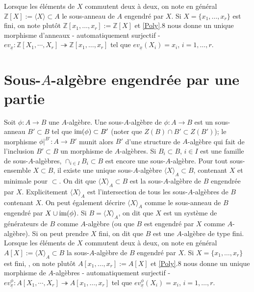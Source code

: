 \documentclass[a4paper, oneside, 12pt]{book}
\theoremstyle{theoremeStyle} %
\theoremstyle{definition} %
\newcommand{\Z}{\mathbb{Z}}
\begin{document}
 Lorsque les éléments de $X$ commutent deux à deux, on note en général $\Z[X]:=\langle X\rangle \subset A$ le sous-anneau de $A$ engendré par $X$. Si  $X=\lbrace x_1,\dots,x_r\rbrace $ est fini, on note plutôt $\Z[x_1,\dots,x_r]:=\Z[X]$ et \ref{Poly}.8  nous donne un unique morphisme d'anneaux - automatiquement  surjectif - $ev_{\underline{x}}:\Z[X_1,\cdots, X_r]\twoheadrightarrow \Z[x_1,\dots,x_r] $ tel que $ev_{\underline{x}}(X_i)=x_i$, $i=1,\dots, r$.   \\

  \section{Sous-$A$-algèbre engendrée par une partie}\label{SousAlg} Soit $\phi:A\rightarrow B$ une $A$-algèbre. Une sous-$A$-algèbre de $\phi:A\rightarrow B$ est un sous-anneau $B'\subset B$ tel que $\hbox{\rm im}(\phi)\subset B'$ (noter que $Z(B)\cap B'\subset Z(B')$); le morphisme $\phi|^{B'}:A\rightarrow B'$ munit alors $B'$ d'une structure de $A$-algèbre qui fait de l'inclusion $B'\subset B$ un morphisme de $A$-algèbres. Si    $B_i\subset B$, $i\in I$ est une famille de sous-$A$-algèbres, $\cap_{i\in I}B_i\subset B$  est encore une sous-$A$-algèbre. Pour tout sous-ensemble $X\subset B$, il existe
une unique sous-$A$-algèbre $\langle X\rangle_A \subset B$, contenant $X$ et minimale pour $\subset$. On dit que $\langle X\rangle_A\subset B$ est la sous-$A$-algèbre de $B$ engendrée par $X$. Explicitement $\langle X\rangle_A$ est l'intersection de tous les sous-$A$-algèbres de $B$ contenant $X$. On peut également décrire $\langle X\rangle_A$ comme  le sous-anneau de $B$ engendré par $X\cup\hbox{\rm im}(\phi)$. Si $B=\langle X\rangle_A$, on dit que $X$ est un système de générateurs de $B$ comme $A$-algèbre (ou que $B$ est engendré par $X$ comme $A$-algèbre). Si on peut prendre $X$ fini, on dit que $B$ est une $A$-algèbre de type fini.\\

 Lorsque les éléments de $X$ commutent deux à deux, on note en général $A[X]:=\langle X\rangle_A \subset B$ la sous-$A$-algèbre de $B$ engendré par $X$. Si  $X=\lbrace x_1,\dots,x_r\rbrace $ est fini, , on note plutôt $A[x_1,\dots,x_r]:=A[X]$ et  \ref{Poly}.8  nous donne un unique morphisme de $A$-algèbres - automatiquement  surjectif - $ev_{\underline{x}}^\phi:A[X_1,\cdots, X_r]\twoheadrightarrow A[x_1,\dots, x_r] $ tel que $ev^\phi_{\underline{x}}(X_i)=x_i$, $i=1,\dots, r$. \\
\end{document}
